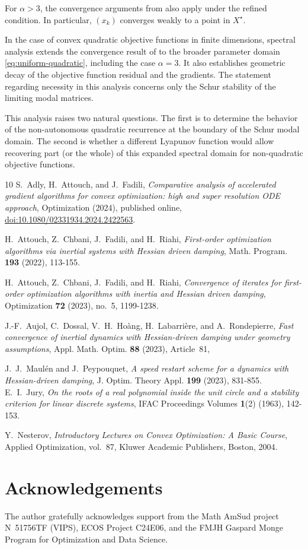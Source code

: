 \documentclass[11pt]{article}
\theoremstyle{plain}
\theoremstyle{definition}
\begin{document}
For $\alpha>3$, the convergence arguments from \cite{ACFR2023} also apply under the refined condition. In particular, $(x_k)$ converges weakly to a point in $X^\star$.

In the case of convex quadratic objective functions in finite dimensions, spectral analysis extends the convergence result of \cite[Theorem 4.3]{ACFR2023} to the broader parameter domain \eqref{eq:uniform-quadratic}, including the case $\alpha=3$. It also establishes geometric decay of the objective function residual and the gradients. The statement regarding necessity in this analysis concerns only the Schur stability of the limiting modal matrices.

This analysis raises two natural questions. The first is to determine the behavior of the non-autonomous quadratic recurrence at the boundary of the Schur modal domain. The second is whether a different Lyapunov function would allow recovering part (or the whole) of this expanded spectral domain for non-quadratic objective functions.

\begin{thebibliography}{10}
S.~Adly, H.~Attouch, and J.~Fadili,
\textit{Comparative analysis of accelerated gradient algorithms for convex
optimization: high and super resolution ODE approach},
Optimization (2024), published online,
\href{https://doi.org/10.1080/02331934.2024.2422563}
{doi:10.1080/02331934.2024.2422563}.

H.~Attouch, Z.~Chbani, J.~Fadili, and H.~Riahi,
\textit{First-order optimization algorithms via inertial systems with
Hessian driven damping},
Math. Program. \textbf{193} (2022), 113-155.

{H.~Attouch, Z.~Chbani, J.~Fadili, and H.~Riahi,
\textit{Convergence of iterates for first-order optimization algorithms
with inertia and Hessian driven damping},
Optimization \textbf{72} (2023), no.~5, 1199-1238.}


J.-F.~Aujol, C.~Dossal, V.~H.~Ho\`ang, H.~Labarri\`ere, and A.~Rondepierre,
\textit{Fast convergence of inertial dynamics with Hessian-driven damping
under geometry assumptions},
Appl. Math. Optim. \textbf{88} (2023), Article~81,



J.~J.~Maul\'en and J.~Peypouquet,
\textit{A speed restart scheme for a dynamics with Hessian-driven damping},
J. Optim. Theory Appl. \textbf{199} (2023), 831-855.
E.~I.~Jury,
\textit{On the roots of a real polynomial inside the unit circle and a
stability criterion for linear discrete systems},
IFAC Proceedings Volumes \textbf{1}(2) (1963), 142-153.

Y.~Nesterov,
\textit{Introductory Lectures on Convex Optimization: A Basic Course},
Applied Optimization, vol.~87, Kluwer Academic Publishers, Boston, 2004.

\end{thebibliography}
\section*{Acknowledgements}
The author gratefully acknowledges support from the Math AmSud project
N\textdegree~51756TF (VIPS), ECOS Project C24E06, and the FMJH Gaspard Monge
Program for Optimization and Data Science.
\end{document}

